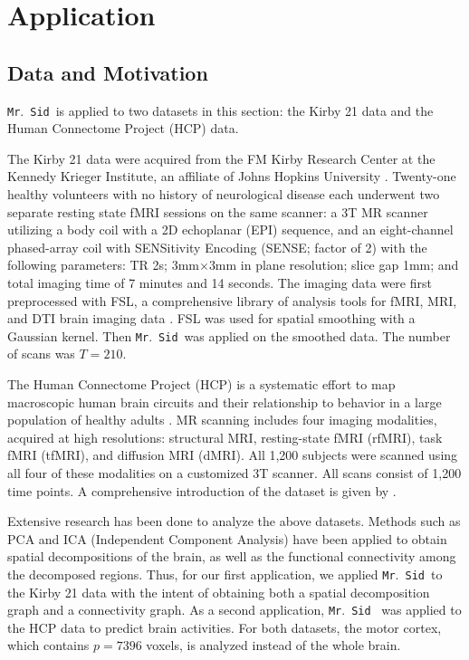\documentclass[times,twocolumn,final,authoryear]{elsarticle}
\newcommand{\mrsid}{{\sc \texttt{Mr}.~\texttt{Sid}}}
\begin{document}
\section{Application}
\label{sec:application}

\subsection{Data and Motivation}
\mrsid~is applied to two datasets in this section: the Kirby 21 data and the Human Connectome Project (HCP) data.

The Kirby 21 data were acquired from the FM Kirby Research Center at the Kennedy Krieger Institute, an affiliate of Johns Hopkins University \citep{landman2011multi}. Twenty-one healthy volunteers with no history of neurological disease each underwent two separate resting state fMRI sessions on the same scanner: a 3T MR scanner utilizing a body coil with a 2D echoplanar (EPI) sequence, and an eight-channel phased-array coil with SENSitivity Encoding (SENSE; factor of 2) with the following parameters: TR 2s; 3mm$\times$3mm in plane resolution; slice gap 1mm; and total imaging time of 7 minutes and 14 seconds. The imaging data were first preprocessed with FSL, a comprehensive library of analysis tools for fMRI, MRI, and DTI brain imaging data \citep{smith2004advances}. FSL was used for spatial smoothing with a Gaussian kernel. Then \mrsid~was applied on the smoothed data.  The number of scans was $T = 210$.

The Human Connectome Project (HCP) is a systematic effort to map macroscopic human brain circuits and their relationship to behavior in a large population of healthy adults \citep{van2013wu,moeller2010multiband,feinberg2010multiplexed}. MR scanning includes four imaging modalities, acquired at high resolutions: structural MRI, resting-state fMRI (rfMRI), task fMRI (tfMRI), and diffusion MRI (dMRI). All 1,200 subjects were scanned using all four of these modalities on a customized 3T scanner.  All scans consist of 1,200 time points. A comprehensive introduction of the dataset is given by \cite{van2013wu}.

Extensive research has been done to analyze the above datasets. Methods such as PCA and ICA (Independent Component Analysis) have been applied to obtain spatial decompositions of the brain, as well as the functional connectivity among the decomposed regions.  Thus, for our first application, we applied \mrsid~to the Kirby 21 data with the intent of obtaining both a spatial decomposition graph and a connectivity graph. As a second application, \mrsid~ was applied to the HCP data to predict brain activities. For both datasets, the motor cortex, which contains $p=7396$ voxels, is analyzed instead of the whole brain.
\end{document}
